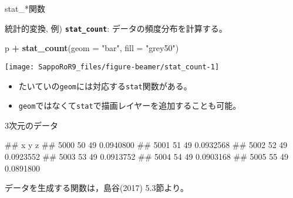 \documentclass[ignorenonframetext,]{beamer}
\newenvironment{Shaded}{\begin{snugshade}}{\end{snugshade}}
\newcommand{\KeywordTok}[1]{\textcolor[rgb]{0.13,0.29,0.53}{\textbf{#1}}}
\newcommand{\DataTypeTok}[1]{\textcolor[rgb]{0.13,0.29,0.53}{#1}}
\newcommand{\DecValTok}[1]{\textcolor[rgb]{0.00,0.00,0.81}{#1}}
\newcommand{\FloatTok}[1]{\textcolor[rgb]{0.00,0.00,0.81}{#1}}
\newcommand{\StringTok}[1]{\textcolor[rgb]{0.31,0.60,0.02}{#1}}
\newcommand{\ControlFlowTok}[1]{\textcolor[rgb]{0.13,0.29,0.53}{\textbf{#1}}}
\newcommand{\OperatorTok}[1]{\textcolor[rgb]{0.81,0.36,0.00}{\textbf{#1}}}
\newcommand{\NormalTok}[1]{#1}
\providecommand{\tightlist}{%
  \setlength{\itemsep}{0pt}\setlength{\parskip}{0pt}}
\let\oldShaded\Shaded
\let\endoldShaded\endShaded
\renewenvironment{Shaded}{\footnotesize\oldShaded}{\endoldShaded}
\let\oldverbatim\verbatim
\let\endoldverbatim\endverbatim
\renewenvironment{verbatim}{\footnotesize\oldverbatim}{\endoldverbatim}
\begin{document}
\begin{frame}[fragile]{stat\_*関数}

統計的変換, 例) \textbf{\texttt{stat\_count}}:
データの頻度分布を計算する。

\begin{Shaded}
\begin{Highlighting}[]
\NormalTok{p }\OperatorTok{+}\StringTok{ }\KeywordTok{stat_count}\NormalTok{(}\DataTypeTok{geom =} \StringTok{"bar"}\NormalTok{, }\DataTypeTok{fill =} \StringTok{"grey50"}\NormalTok{)}
\end{Highlighting}
\end{Shaded}

\texttt{[image: SappoRoR9\_files/figure-beamer/stat\_count-1]}

\begin{itemize}
\tightlist
\item
  たいていの\texttt{geom}には対応する\texttt{stat}関数がある。
\item
  \texttt{geom}ではなくて\texttt{stat}で描画レイヤーを追加することも可能。
\end{itemize}

\end{frame}

\begin{frame}[fragile]{3次元のデータ}

\begin{Shaded}
\end{Shaded}

\begin{verbatim}
##       x  y         z
## 5000 50 49 0.0940800
## 5001 51 49 0.0932568
## 5002 52 49 0.0923552
## 5003 53 49 0.0913752
## 5004 54 49 0.0903168
## 5005 55 49 0.0891800
\end{verbatim}

\footnotesize データを生成する関数は，島谷(2017) 5.3節より。

\end{frame}
\end{document}
